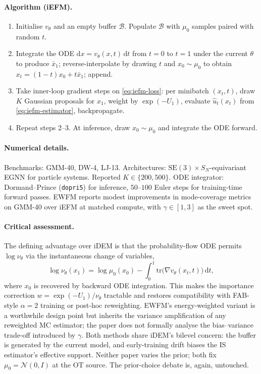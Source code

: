 \documentclass[11pt,letterpaper]{article}
\newcommand{\dd}{\mathrm{d}}
\theoremstyle{plain}
\begin{document}
\paragraph{Algorithm (iEFM).}
\begin{enumerate}\setlength{\itemsep}{1pt}
  \item Initialise $v_\theta$ and an empty buffer $\mathcal B$. Populate
    $\mathcal B$ with $\mu_0$ samples paired with random $t$.
  \item Integrate the ODE $\dd x = v_\theta(x,t)\,\dd t$ from $t=0$ to $t=1$
    under the current $\theta$ to produce $\bar x_1$; reverse-interpolate by
    drawing $t$ and $x_0\sim\mu_0$ to obtain $x_t=(1-t)x_0+t\bar x_1$; append.
  \item Take inner-loop gradient steps on \eqref{eq:iefm-loss}: per minibatch
    $(x_t,t)$, draw $K$ Gaussian proposals for $x_1$, weight by
    $\exp(-U_1)$, evaluate $\widehat u_t(x_t)$ from
    \eqref{eq:iefm-estimator}, backpropagate.
  \item Repeat steps 2--3. At inference, draw $x_0\sim\mu_0$ and integrate
    the ODE forward.
\end{enumerate}

\paragraph{Numerical details.} Benchmarks: GMM-40, DW-4, LJ-13. Architectures:
$\mathrm{SE}(3)\times S_N$-equivariant EGNN for particle systems. Reported
$K\in\{200,500\}$. ODE integrator: Dormand--Prince (\texttt{dopri5}) for
inference, $50$--$100$ Euler steps for training-time forward passes. EWFM
reports modest improvements in mode-coverage metrics on GMM-40 over iEFM at
matched compute, with $\gamma\in[1,3]$ as the sweet spot.

\paragraph{Critical assessment.} The defining advantage over iDEM is that
the probability-flow ODE permits $\log\nu_\theta$ via the instantaneous
change of variables,
\[
  \log\nu_\theta(x_1) = \log\mu_0(x_0) - \int_0^1\!\mathrm{tr}\!\big(\nabla v_\theta(x_t,t)\big)\,\dd t,
\]
where $x_0$ is recovered by backward ODE integration. This makes the
importance correction $w=\exp(-U_1)/\nu_\theta$ tractable and restores
compatibility with FAB-style $\alpha=2$ training or post-hoc reweighting.
EWFM's energy-weighted variant is a worthwhile design point but inherits the
variance amplification of any reweighted MC estimator; the paper does not
formally analyse the bias--variance trade-off introduced by $\gamma$. Both
methods share iDEM's bilevel concern: the buffer is generated by the current
model, and early-training drift biases the IS estimator's effective support.
Neither paper varies the prior; both fix $\mu_0=\mathcal N(0,I)$ at the OT
source. The prior-choice debate is, again, untouched.
\end{document}

